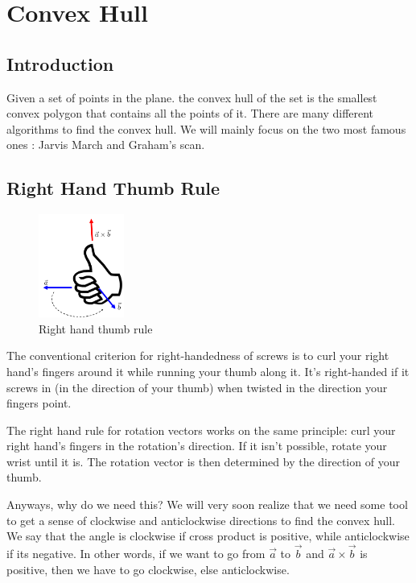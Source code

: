 \chapter{Convex Hull}
\section{Introduction}
Given a set of points in the plane. the convex hull of the set is the smallest convex polygon that contains all the points of it. There are many different algorithms to find the convex hull. We will mainly focus on the two most famous ones : Jarvis March and Graham's scan.  

\section{Right Hand Thumb Rule}
\begin{figure}
\centering
\includegraphics[width=0.25\textwidth]{images/rhtr.png}
\caption{\label{fig:frog1}Right hand thumb rule}
\end{figure}

The conventional criterion for right-handedness of screws is to curl your right hand's fingers around it while running your thumb along it. It's right-handed if it screws in (in the direction of your thumb) when twisted in the direction your fingers point.

The right hand rule for rotation vectors works on the same principle: curl your right hand's fingers in the rotation's direction. If it isn't possible, rotate your wrist until it is. The rotation vector is then determined by the direction of your thumb.

Anyways, why do we need this? We will very soon realize that we need some tool to get a sense of clockwise and anticlockwise directions to find the convex hull. We say that the angle is clockwise if cross product is positive, while anticlockwise if its negative. In other words, if we want to go from $\vec{a}$ to $\vec{b}$ and $\vec{a} \times \vec{b}$ is positive, then we have to go clockwise, else anticlockwise. \clearpage
